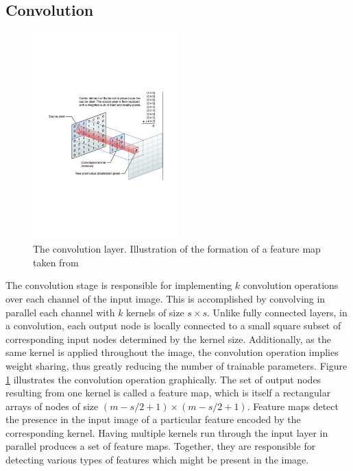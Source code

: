 \subsection{Convolution}

\begin{figure}
\centering
\includegraphics[trim=2cm 7cm 2cm 7cm, clip=true, height=80mm]{Chapter2/convolution.pdf}
\caption{The convolution layer. Illustration of the formation of a feature map taken from \citep{url_convolution}}
\label{convolution_operation}
\end{figure}

\noindent The convolution stage is responsible for implementing $k$ convolution operations over each channel of the input image. This is accomplished by convolving in parallel each channel with $k$ kernels of size $s \times s$. Unlike fully connected layers, in a convolution, each output node is locally connected to a small square subset of corresponding input nodes determined by the kernel size. Additionally, as the same kernel is applied throughout the image, the convolution operation implies weight sharing, thus greatly reducing the number of trainable parameters. Figure \ref{convolution_operation} illustrates the convolution operation graphically. The set of output nodes resulting from one kernel is called a feature map, which is itself a rectangular arrays of nodes of size $(m - s/2 + 1) \times (m - s/2 + 1)$. Feature maps detect the presence in the input image of a particular feature encoded by the corresponding kernel. Having multiple kernels run through the input layer in parallel produces a set of feature maps. Together, they are responsible for detecting various types of features which might be present in the image. \\

